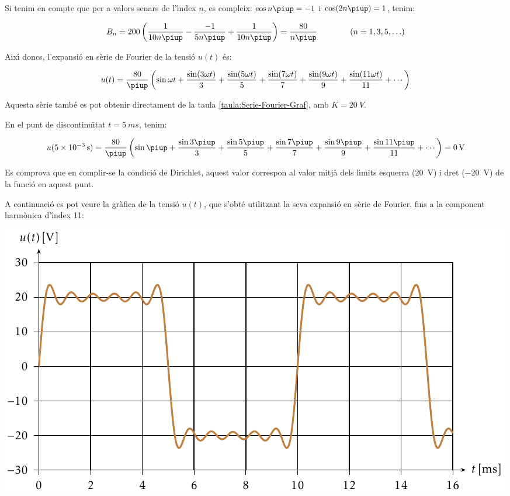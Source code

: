 \begin{exemple}
    Si tenim en compte que per a valors senars de l'\'{\i}ndex $n$, es
    compleix: $\cos n \piup = -1$ i $\cos (2 n \piup) = 1$, tenim:

    \[
        B_n = 200 \left( \frac{1}{10 n \piup} - \frac{-1}{5 n \piup} +
        \frac{1}{10 n \piup} \right) = \frac{80}{n \piup}
        \qquad\qquad(n=1,3,5,\ldots)
    \]

    Aix\'{\i} doncs, l'expansi\'{o} en s\`{e}rie de Fourier de la tensi\'{o} $u(t)$ \'{e}s:

    \[
        u(t) = \frac{80}{\piup} \left( \sin \omega t + \frac{\sin (3 \omega t)}{3} +
        \frac{\sin (5 \omega t)}{5} + \frac{\sin (7 \omega t)}{7} +
        \frac{\sin (9 \omega t)}{9} + \frac{\sin (11 \omega t)}{11} +\cdots\right)
    \]

    Aquesta s\`{e}rie tamb\'{e} es pot obtenir directament de la taula \vref{taula:Serie-Fourier-Graf}, amb $K=\SI{20}{V}$.

    En el punt de discontinu\"{\i}tat $t=\SI{5}{ms}$, tenim:

    \[
        u(\SI{5e-3}{s}) =\frac{80}{\piup} \left( \sin \piup + \frac{\sin 3 \piup}{3} +
        \frac{\sin 5 \piup}{5} + \frac{\sin 7 \piup}{7} +
        \frac{\sin 9 \piup}{9} +\frac{\sin 11 \piup}{11}+\cdots\right) = \SI{0}{V}
    \]

    Es comprova que en complir-se la condici\'{o} de Dirichlet, aquest valor
    correspon al valor mitj\`{a} dels l\'{\i}mits esquerra (\SI{20}{V}) i dret (\SI{-20}{V})  de
    la funci\'{o} en aquest punt.

    A continuaci\'{o} es pot veure la gr\`{a}fica de la tensi\'{o} $u(t)$, que
    s'obt\'{e} utilitzant la seva expansi\'{o} en s\`{e}rie de Fourier, fins a la
    component harm\`{o}nica d'\'{\i}ndex 11:

    \begin{center}
        \includegraphics{Imatges/Cap-Fourier-Exemple-Tensio.pdf}
    \end{center}


\end{exemple}
